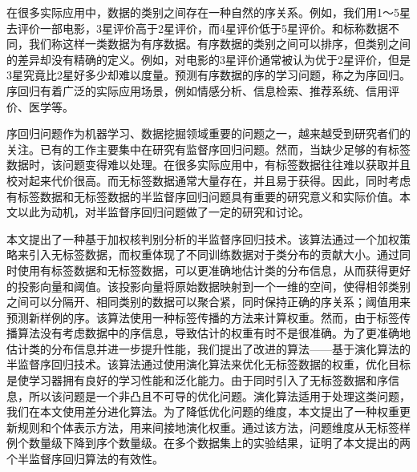 ﻿
\begin{cnabstract}

在很多实际应用中，数据的类别之间存在一种自然的序关系。例如，我们用1～5星去评价一部电影，3星评价高于2星评价，而4星评价低于5星评价。和标称数据不同，我们称这样一类数据为有序数据。有序数据的类别之间可以排序，但类别之间的差异却没有精确的定义。例如，对电影的3星评价通常被认为优于2星评价，但是3星究竟比2星好多少却难以度量。预测有序数据的序的学习问题，称之为序回归。序回归有着广泛的实际应用场景，例如情感分析、信息检索、推荐系统、信用评价、医学等。

序回归问题作为机器学习、数据挖掘领域重要的问题之一，越来越受到研究者们的关注。已有的工作主要集中在研究有监督序回归问题。然而，当缺少足够的有标签数据时，该问题变得难以处理。在很多实际应用中，有标签数据往往难以获取并且校对起来代价很高。而无标签数据通常大量存在，并且易于获得。因此，同时考虑有标签数据和无标签数据的半监督序回归问题具有重要的研究意义和实际价值。本文以此为动机，对半监督序回归问题做了一定的研究和讨论。

本文提出了一种基于加权核判别分析的半监督序回归技术。该算法通过一个加权策略来引入无标签数据，而权重体现了不同训练数据对于类分布的贡献大小。通过同时使用有标签数据和无标签数据，可以更准确地估计类的分布信息，从而获得更好的投影向量和阈值。该投影向量将原始数据映射到一个一维的空间，使得相邻类别之间可以分隔开、相同类别的数据可以聚合紧，同时保持正确的序关系；阈值用来预测新样例的序。该算法使用一种标签传播的方法来计算权重。然而，由于标签传播算法没有考虑数据中的序信息，导致估计的权重有时不是很准确。为了更准确地估计类的分布信息并进一步提升性能，我们提出了改进的算法——基于演化算法的半监督序回归技术。该算法通过使用演化算法来优化无标签数据的权重，优化目标是使学习器拥有良好的学习性能和泛化能力。由于同时引入了无标签数据和序信息，所以该问题是一个非凸且不可导的优化问题。演化算法适用于处理这类问题，我们在本文使用差分进化算法。为了降低优化问题的维度，本文提出了一种权重更新规则和个体表示方法，用来间接地演化权重。通过该方法，问题维度从无标签样例个数量级下降到序个数量级。在多个数据集上的实验结果，证明了本文提出的两个半监督序回归算法的有效性。


\end{cnabstract}


